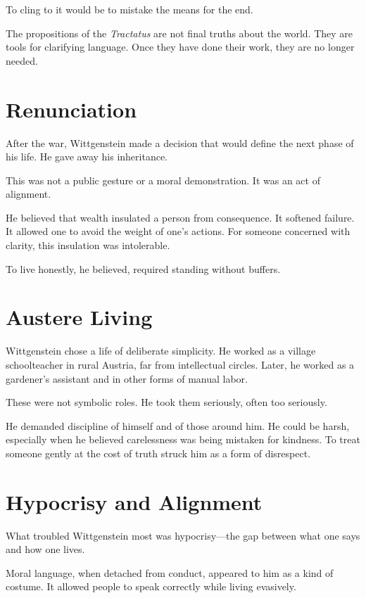 \documentclass[11pt]{article}
\begin{document}
To cling to it would be to mistake the means for the end.

The propositions of the \emph{Tractatus} are not final truths about the world. They are tools for clarifying language. Once they have done their work, they are no longer needed.

\section*{Renunciation}

After the war, Wittgenstein made a decision that would define the next phase of his life. He gave away his inheritance.

This was not a public gesture or a moral demonstration. It was an act of alignment.

He believed that wealth insulated a person from consequence. It softened failure. It allowed one to avoid the weight of one’s actions. For someone concerned with clarity, this insulation was intolerable.

To live honestly, he believed, required standing without buffers.

\section*{Austere Living}

Wittgenstein chose a life of deliberate simplicity. He worked as a village schoolteacher in rural Austria, far from intellectual circles. Later, he worked as a gardener’s assistant and in other forms of manual labor.

These were not symbolic roles. He took them seriously, often too seriously.

He demanded discipline of himself and of those around him. He could be harsh, especially when he believed carelessness was being mistaken for kindness. To treat someone gently at the cost of truth struck him as a form of disrespect.

\section*{Hypocrisy and Alignment}

What troubled Wittgenstein most was hypocrisy—the gap between what one says and how one lives.

Moral language, when detached from conduct, appeared to him as a kind of costume. It allowed people to speak correctly while living evasively.
\end{document}
